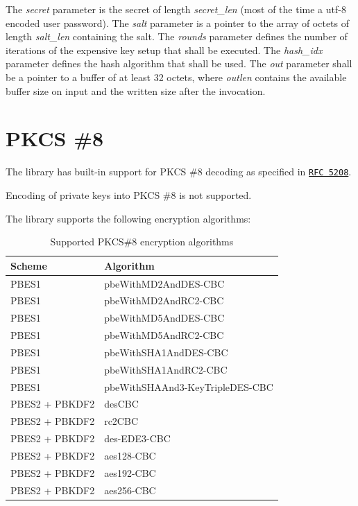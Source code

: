 \documentclass[synpaper]{book}
\newcommand{\mysection}[1]    %
	{                   %
	\section{#1}
   \markboth{\textsf{www.libtom.net}}{\thesection ~ {#1}}
	}
\begin{document}
The \textit{secret} parameter is the secret of length \textit{secret\_len} (most of the time a utf-8 encoded user password).
The \textit{salt} parameter is a pointer to the array of octets of length \textit{salt\_len} containing the salt.
The \textit{rounds} parameter defines the number of iterations of the expensive key setup that shall be executed.
The \textit{hash\_idx} parameter defines the hash algorithm that shall be used.
The \textit{out} parameter shall be a pointer to a buffer of at least 32 octets,
where \textit{outlen} contains the available buffer size on input and the written size after the invocation.


\mysection{PKCS \#8}
\label{pkcs8}

The library has built-in support for PKCS \#8 decoding as specified in \href{https://datatracker.ietf.org/doc/html/rfc5208}{\texttt{RFC 5208}}.

Encoding of private keys into PKCS \#8 is not supported.

The library supports the following encryption algorithms:

\begin{table}[H]
\begin{center}
\begin{tabular}{|l|l|}
      \hline \textbf{Scheme} & \textbf{Algorithm}              \\
      \hline PBES1           & pbeWithMD2AndDES-CBC            \\
      \hline PBES1           & pbeWithMD2AndRC2-CBC            \\
      \hline PBES1           & pbeWithMD5AndDES-CBC            \\
      \hline PBES1           & pbeWithMD5AndRC2-CBC            \\
      \hline PBES1           & pbeWithSHA1AndDES-CBC           \\
      \hline PBES1           & pbeWithSHA1AndRC2-CBC           \\
      \hline PBES1           & pbeWithSHAAnd3-KeyTripleDES-CBC \\
      \hline PBES2 + PBKDF2  & desCBC                          \\
      \hline PBES2 + PBKDF2  & rc2CBC                          \\
      \hline PBES2 + PBKDF2  & des-EDE3-CBC                    \\
      \hline PBES2 + PBKDF2  & aes128-CBC                      \\
      \hline PBES2 + PBKDF2  & aes192-CBC                      \\
      \hline PBES2 + PBKDF2  & aes256-CBC                      \\
      \hline
\end{tabular}
\caption{Supported PKCS\#8 encryption algorithms}
\end{center}
\label{fig:pkcs8}
\end{table}
\end{document}
